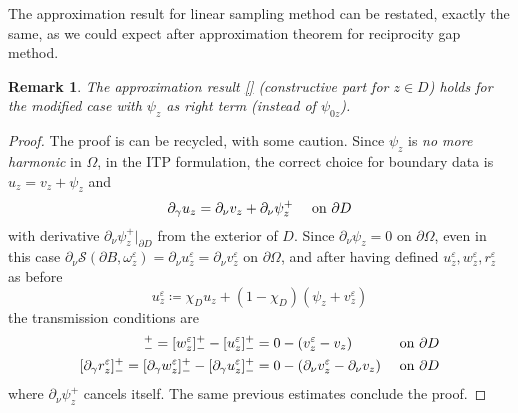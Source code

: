 \documentclass[10pt, a4paper, twoside, openright]{book}
\theoremstyle{definition}
\theoremstyle{plain}
\theoremstyle{plain}
\theoremstyle{plain}
\theoremstyle{plain}
\newtheorem{remark}[subsection]{Remark}
\theoremstyle{plain}
\theoremstyle{plain}
\theoremstyle{plain}
\theoremstyle{plain}
\let\epsilon\varepsilon
\begin{document}
The approximation result for linear sampling method can be restated, exactly the same, as we could expect after approximation theorem for reciprocity gap method.

\begin{remark}
 The approximation result \ref{} (constructive part for $z \in D$) holds for the modified case with $\psi_z$ as right term (instead of $\psi_{0z}$).
\end{remark}
\begin{proof}
 The proof is can be recycled, with some caution.
 Since $\psi_z$ is \emph{no more harmonic} in $\Omega$, in the ITP formulation, the correct choice for boundary data is $u_z = v_z + \psi_z$ and
 \begin{equation}
 \partial_\gamma u_z = \partial_\nu v_z + \partial_\nu\psi_z^+ \quad \textup{ on }\partial D
 \end{equation}
 with derivative $\partial_\nu\psi_z^+|_{\partial D}$ from the exterior of $D$. Since $\partial_\nu\psi_z = 0$ on $\partial \Omega$, even in this case $\partial_\nu\mathcal{S}(\partial B, \omega^\epsilon_z) = \partial_\nu u^\epsilon_z = \partial_\nu v^\epsilon_z$ on $\partial \Omega$, 
 and after having defined $u^\epsilon_z, w^\epsilon_z, r^\epsilon_z$ as before
 \begin{equation}
   u^\epsilon_z\coloneqq\chi_Du_z + (1-\chi_D)(\psi_{z} + v^\epsilon_z) 
 \end{equation}
 the transmission conditions are
  \begin{align}
   [r^\epsilon_z]^+_- = [w^\epsilon_z]^+_- -[u^\epsilon_z]^+_- &=0 - (v^\epsilon_z - v_z) && \textup{ on }\partial D \\
   [\partial_\gamma r^\epsilon_z]^+_- = [\partial_\gamma w^\epsilon_z]^+_- -[\partial_\gamma u^\epsilon_z]^+_-&= 0 - (\partial_\nu v^\epsilon_z - \partial_\nu v_z) && \textup{ on }\partial D 
  \end{align}
  where $\partial_\nu\psi_z^+$ cancels itself. The same previous estimates conclude the proof.
\end{proof}
\end{document}
